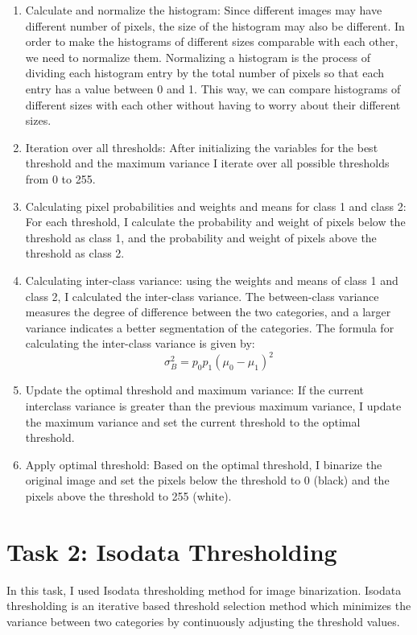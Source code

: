 \documentclass[11pt]{report}
\begin{document}
\begin{enumerate}
    \item Calculate and normalize the histogram: Since different images may have different number of pixels, the size of the histogram may also be different. In order to make the histograms of different sizes comparable with each other, we need to normalize them. Normalizing a histogram is the process of dividing each histogram entry by the total number of pixels so that each entry has a value between 0 and 1. This way, we can compare histograms of different sizes with each other without having to worry about their different sizes.
    \item Iteration over all thresholds: After initializing the variables for the best threshold and the maximum variance I iterate over all possible thresholds from 0 to 255.
    \item Calculating pixel probabilities and weights and means for class 1 and class 2: For each threshold, I calculate the probability and weight of pixels below the threshold as class 1, and the probability and weight of pixels above the threshold as class 2.
    \item Calculating inter-class variance: using the weights and means of class 1 and class 2, I calculated the inter-class variance. The between-class variance measures the degree of difference between the two categories, and a larger variance indicates a better segmentation of the categories. The formula for calculating the inter-class variance is given by:
    $$\sigma_{B}^{2}=p_{0}p_{1}(\mu_{0}-\mu_{1})^{2}$$
    \item Update the optimal threshold and maximum variance: If the current interclass variance is greater than the previous maximum variance, I update the maximum variance and set the current threshold to the optimal threshold.
    \item Apply optimal threshold: Based on the optimal threshold, I binarize the original image and set the pixels below the threshold to 0 (black) and the pixels above the threshold to 255 (white).
\end{enumerate}

\section*{Task 2: Isodata Thresholding}

In this task, I used Isodata thresholding method for image binarization. Isodata thresholding is an iterative based threshold selection method which minimizes the variance between two categories by continuously adjusting the threshold values.
\end{document}
